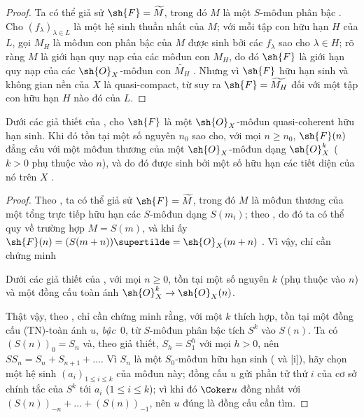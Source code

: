 \documentclass[oneside,10pt]{amsart}
\makeatletter
\renewcommand{\leq}{\leqslant}
\renewcommand{\geq}{\geqslant}
\newcommand{\ega@arrow}[2]{\mathchoice{#1}{#2}{#2}{#2}}
\renewcommand{\to}{\ega@arrow{\longrightarrow}{\rightarrow}}
\newcommand{\oldpage}[2][]{\marginnote{\normalfont\footnotesize\textbf{#1}~|~#2}\ignorespaces}
\let\EGAOriginalLabel\label
\renewcommand{\label}[1]{\phantomsection\EGAOriginalLabel{#1}}
\makeatother
\begin{document}
\begin{proof}
Ta có thể giả sử $\sh{F}=\widetilde{M}$, trong đó $M$ là một $S$-môđun phân bậc .
Cho $(f_\lambda)_{\lambda\in L}$ là một hệ sinh thuần nhất của $M$;
với mỗi tập con hữu hạn $H$ của $L$, gọi $M_H$ là môđun con phân bậc của $M$ được sinh bởi các $f_\lambda$ sao cho $\lambda\in H$;
rõ ràng $M$ là giới hạn quy nạp của các môđun con $M_H$, do đó $\sh{F}$ là giới hạn quy nạp của các $\sh{O}_X$-môđun con $\widetilde{M_H}$ .
Nhưng vì $\sh{F}$ hữu hạn sinh và không gian nền của $X$ là quasi-compact, từ  suy ra $\sh{F}=\widetilde{M_H}$ đối với một tập con hữu hạn $H$ nào đó của $L$.
\end{proof}

\begin{corollary}[2.7.9]
\label{II.2.7.9}
Dưới các giả thiết của , cho $\sh{F}$ là một $\sh{O}_X$-môđun quasi-coherent hữu hạn sinh.
Khi đó tồn tại một số nguyên $n_0$ sao cho, với mọi $n\geq n_0$, $\sh{F}(n)$ đẳng cấu với một môđun thương của một $\sh{O}_X$-môđun dạng $\sh{O}_X^k$ ($k>0$ phụ thuộc vào $n$), và do đó được sinh bởi một số hữu hạn các tiết diện của nó trên $X$ .
\end{corollary}

\begin{proof}
Theo , ta có thể giả sử $\sh{F}=\widetilde{M}$, trong đó $M$ là môđun thương của một tổng trực tiếp hữu hạn các $S$-môđun dạng $S(m_i)$;
theo , do đó ta có thể quy về trường hợp $M=S(m)$, và khi ấy $\sh{F}(n)=(S(m+n))\supertilde=\sh{O}_X(m+n)$ .
Vì vậy, chỉ cần chứng minh
\oldpage[II]{41}
  \begin{lemma}[2.7.9.1]
  \label{II.2.7.9.1}
  Dưới các giả thiết của , với mọi $n\geq0$, tồn tại một số nguyên $k$ (phụ thuộc vào $n$) và một đồng cấu toàn ánh $\sh{O}_X^k\to\sh{O}_X(n)$.
  \end{lemma}

Thật vậy, theo , chỉ cần chứng minh rằng, với một $k$ thích hợp, tồn tại một đồng cấu (TN)-toàn ánh $u$, \emph{bậc~$0$}, từ $S$-môđun phân bậc tích $S^k$ vào $S(n)$.
Ta có $(S(n))_0=S_n$ và, theo giả thiết, $S_h=S_1^h$ với mọi $h>0$, nên $SS_n=S_n+S_{n+1}+\ldots$.
Vì $S_n$ là một $S_0$-môđun hữu hạn sinh ( và [i]), hãy chọn một hệ sinh $(a_i)_{1\leq i\leq k}$ của môđun này;
đồng cấu $u$ gửi phần tử thứ $i$ của cơ sở chính tắc của $S^k$ tới $a_i$ ($1\leq i\leq k$);
vì khi đó $\Coker u$ đồng nhất với $(S(n))_{-n}+\ldots+(S(n))_{-1}$, nên $u$ đúng là đồng cấu cần tìm.
\end{proof}
\end{document}
